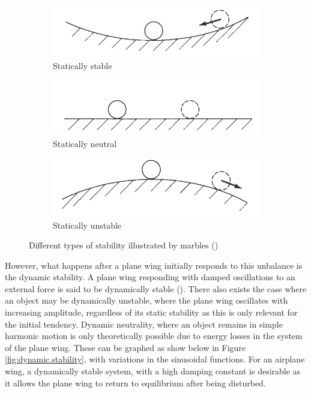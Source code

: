 \documentclass[12pt]{article}
\begin{document}
\begin{figure}[h]
     \centering
     \begin{subfigure}[b]{0.3\textwidth}
         \centering
         \includegraphics[width=\textwidth]{images/positive static.png}
         \caption{Statically stable}
         \label{fig:s.stable}
     \end{subfigure}
     \hfill
     \begin{subfigure}[b]{0.3\textwidth}
         \centering
         \includegraphics[width=\textwidth]{images/statically neutral.png}
         \caption{Statically neutral}
         \label{fig:s.neutral}
     \end{subfigure}
     \hfill
     \begin{subfigure}[b]{0.3\textwidth}
         \centering
         \includegraphics[width=\textwidth]{images/statically unstable.png}
         \caption{Statically unstable}
         \label{fig:s.unstable}
     \end{subfigure}
     \hfill
        \caption{Different types of stability illustrated by marbles (\citeauthor{anderson_bowden_2022})}
        \label{fig:static.stability}
\end{figure}

However, what happens after a plane wing initially responds to this unbalance is the dynamic stability. A plane wing responding with damped oscillations to an external force is said to be dynamically stable (\citeauthor{anderson_bowden_2022}). There also exists the case where an object may be dynamically unstable, where the plane wing oscillates with increasing amplitude, regardless of its static stability as this is only relevant for the initial tendency. Dynamic neutrality, where an object remains in simple harmonic motion is only theoretically possible due to energy losses in the system of the plane wing. These can be graphed as show below in Figure \ref{fig:dynamic.stability}, with variations in the sinusoidal functions. For an airplane wing, a dynamically stable system, with a high damping constant is desirable as it allows the plane wing to return to equilibrium after being disturbed.
\end{document}
